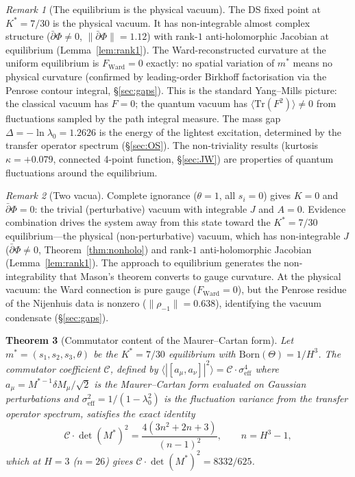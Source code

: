 \documentclass[11pt,a4paper]{article}
\newtheorem{theorem}{Theorem}[section]
\theoremstyle{definition}
\theoremstyle{remark}
\newtheorem{remark}[theorem]{Remark}
\newcommand{\dbar}{\bar{\partial}}
\newcommand{\Tr}{\mathrm{Tr}}
\begin{document}
\begin{remark}[The equilibrium is the physical vacuum]\label{rem:vacuum}
The DS fixed point at $K^*=7/30$ is the physical vacuum. It has non-integrable almost complex structure ($\dbar\Phi\neq 0$, $\|\dbar\Phi\|=1.12$) with rank-$1$ anti-holomorphic Jacobian at equilibrium (Lemma~\ref{lem:rank1}). The Ward-reconstructed curvature at the uniform equilibrium is $F_{\mathrm{Ward}}=0$ exactly: no spatial variation of $m^*$ means no physical curvature (confirmed by leading-order Birkhoff factorisation via the Penrose contour integral, \S\ref{sec:gaps}). This is the standard Yang--Mills picture: the classical vacuum has $F=0$; the quantum vacuum has $\langle\Tr(F^2)\rangle\neq 0$ from fluctuations sampled by the path integral measure. The mass gap $\Delta=-\ln\lambda_0=1.2626$ is the energy of the lightest excitation, determined by the transfer operator spectrum (\S\ref{sec:OS}). The non-triviality results (kurtosis $\kappa=+0.079$, connected 4-point function, \S\ref{sec:JW}) are properties of quantum fluctuations around the equilibrium.
\end{remark}

\begin{remark}[Two vacua]
Complete ignorance ($\theta=1$, all $s_i=0$) gives $K=0$ and $\dbar\Phi=0$: the trivial (perturbative) vacuum with integrable $J$ and $A=0$. Evidence combination drives the system away from this state toward the $K^*=7/30$ equilibrium---the physical (non-perturbative) vacuum, which has non-integrable $J$ ($\dbar\Phi\neq 0$, Theorem~\ref{thm:nonholo}) and rank-$1$ anti-holomorphic Jacobian (Lemma~\ref{lem:rank1}). The approach to equilibrium generates the non-integrability that Mason's theorem converts to gauge curvature. At the physical vacuum: the Ward connection is pure gauge ($F_{\mathrm{Ward}}=0$), but the Penrose residue of the Nijenhuis data is nonzero ($\|\rho_{-1}\|=0.638$), identifying the vacuum condensate (\S\ref{sec:gaps}).
\end{remark}

\begin{theorem}[Commutator content of the Maurer--Cartan form]\label{thm:condensate}
Let $m^*=(s_1,s_2,s_3,\theta)$ be the $K^*=7/30$ equilibrium with $\mathrm{Born}(\Theta)=1/H^3$. The commutator coefficient $\mathcal{C}$, defined by $\langle|[a_\mu,a_\nu]|^2\rangle=\mathcal{C}\cdot\sigma_{\mathrm{eff}}^4$ where $a_\mu=M^{*-1}\delta M_\mu/\sqrt{2}$ is the Maurer--Cartan form evaluated on Gaussian perturbations and $\sigma_{\mathrm{eff}}^2=1/(1-\lambda_0^2)$ is the fluctuation variance from the transfer operator spectrum, satisfies the exact identity
\begin{equation}\label{eq:condensate}
\mathcal{C}\cdot\det(M^*)^2=\frac{4(3n^2+2n+3)}{(n-1)^2},\qquad n=H^3-1,
\end{equation}
which at $H=3$ ($n=26$) gives $\mathcal{C}\cdot\det(M^*)^2=8332/625$.
\end{theorem}
\end{document}
